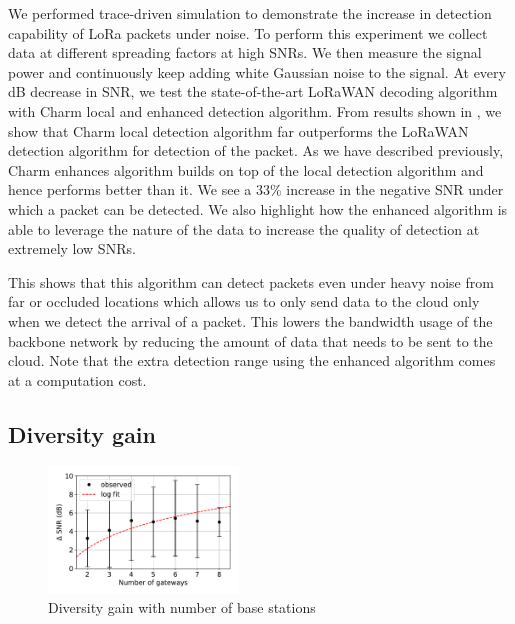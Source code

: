 {\color{purple}
We performed trace-driven simulation to demonstrate the increase in detection capability of LoRa packets under noise. To perform this experiment we collect data at different spreading factors at high SNRs. We then measure the signal power and continuously keep adding white Gaussian noise to the signal. At every dB decrease in SNR, we test the state-of-the-art LoRaWAN decoding algorithm with Charm local and enhanced detection algorithm. From results shown in , we show that Charm local detection algorithm far outperforms the LoRaWAN detection algorithm for detection of the packet. As we have described previously, Charm enhances algorithm builds on top of the local detection algorithm and hence performs better than it. We see a 33\% increase in the negative SNR under which a packet can be detected. We also highlight how the enhanced algorithm is able to leverage the nature of the data to increase the quality of detection at extremely low SNRs. 

This shows that this algorithm can detect packets even under heavy noise from far or occluded locations which allows us to only send data to the cloud only when we detect the arrival of a packet. This lowers the bandwidth usage of the backbone network by reducing the amount of data that needs to be sent to the cloud. Note that the extra detection range using the enhanced algorithm comes at a computation cost.
}
{\color{violet}

}

\subsection{Diversity gain}
\label{sec:diversity-gain-eval}

\begin{figure}[!ht]
\centering
\includegraphics[width=0.45\textwidth]{figures/diversity_gain}
\caption{Diversity gain with number of base stations}
\label{fig:diversity-gain}
\end{figure}

